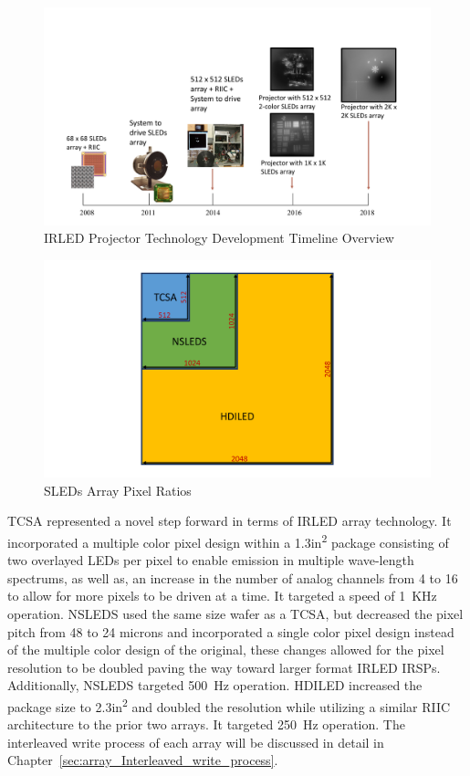 \begin{figure}
    \centering
    \includegraphics[trim=0.5in 0.5in 0.5in 1.5in,width=1.0\textwidth]{fig/sleds_timeline.pdf}
    \caption{IRLED Projector Technology Development Timeline Overview}
    \label{fig:sleds_timeline}
\end{figure}

\begin{figure}
    \centering
    \includegraphics[trim=0.5in 0.5in 0.5in 1.5in,width=1.0\textwidth]{fig/tcsa_nsleds_hdiled_array_ratio.pdf}
    \caption{SLEDs Array Pixel Ratios}
    \label{fig:tcsa_nsleds_hdiled_array_ratio}
\end{figure}

TCSA represented a novel step forward in terms of IRLED array technology. It incorporated a multiple color pixel design within a 1.3in\textsuperscript{2} package consisting of two overlayed LEDs per pixel to enable emission in multiple wave-length spectrums, as well as, an increase in the number of analog channels from 4 to 16 to allow for more pixels to be driven at a time. It targeted a speed of \mbox{1 KHz} operation. NSLEDS used the same size wafer as a TCSA, but decreased the pixel pitch from 48 to 24 microns and incorporated a single color pixel design instead of the multiple color design of the original, these changes allowed for the pixel resolution to be doubled paving the way toward larger format IRLED IRSPs. Additionally, NSLEDS targeted \mbox{500 Hz} operation. HDILED increased the package size to 2.3in\textsuperscript{2} and doubled the resolution while utilizing a similar RIIC architecture to the prior two arrays. It targeted \mbox{250 Hz} operation. The interleaved write process of each array will be discussed in detail in Chapter~\ref{sec:array_Interleaved_write_process}.


